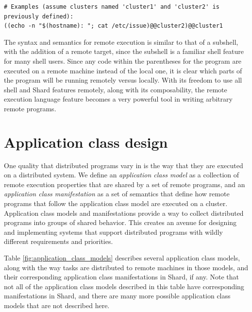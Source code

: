 \documentclass[oneside]{report}
\begin{document}
\begin{minipage}[c]{\textwidth-15pt}
  \begin{lstlisting}[language=Shard]
# Examples (assume clusters named 'cluster1' and 'cluster2' is previously defined):
((echo -n "$(hostname): "; cat /etc/issue)@@cluster2)@@cluster1
\end{lstlisting}
  \smallskip
\end{minipage}

The syntax and semantics for remote execution is similar to that of a subshell, with the addition of a remote target, since the subshell is a familiar shell feature for many shell users.
Since any code within the parentheses for the program are executed on a remote machine instead of the local one, it is clear which parts of the program will be running remotely versus locally.
With its freedom to use all shell and Shard features remotely, along with its composability, the remote execution language feature becomes a very powerful tool in writing arbitrary remote programs.


\section{Application class design}


One quality that distributed programs vary in is the way that they are executed on a distributed system.
We define an \textit{application class model} as a collection of remote execution properties that are shared by a set of remote programs, and an \textit{application class manifestation} as a set of semantics that define how remote programs that follow the application class model are executed on a cluster.
Application class models and manifestations provide a way to collect distributed programs into groups of shared behavior.
This creates an avenue for designing and implementing systems that support distributed programs with wildly different requirements and priorities.

Table \ref{fig:application_class_models} describes several application class models, along with the way tasks are distributed to remote machines in those models, and their corresponding application class manifestations in Shard, if any.
Note that not all of the application class models described in this table have corresponding manifestations in Shard, and there are many more possible application class models that are not described here.
\end{document}
